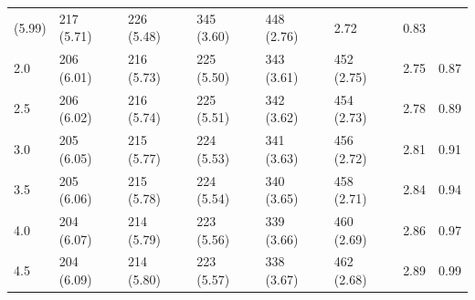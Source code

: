 \begin{table}[h]
{\begin{tabular}{@{}llllllll@{}}
            (5.99)                             &
            217 (5.71) & 226
            (5.48)                             &
            345 (3.60) & 448
            (2.76)                             &
            2.72          &
            0.83
            \\
            2.0                                   & 206 (6.01)
                                                  & 216
            (5.73)                             & 225 (5.50)
                                                  & 343
            (3.61)                             & 452 (2.75)
                                                  &
            2.75                                  & 0.87
            \\
            2.5                                   & 206
            (6.02)                             &
            216 (5.74) & 225
            (5.51)                             &
            342 (3.62) & 454
            (2.73)                             &
            2.78          &
            0.89
            \\
            3.0                                   & 205 (6.05)
                                                  & 215
            (5.77)                             & 224 (5.53)
                                                  & 341
            (3.63)                             & 456 (2.72)
                                                  &
            2.81                                  & 0.91
            \\
            3.5                                   & 205
            (6.06)                             &
            215 (5.78) & 224
            (5.54)                             &
            340 (3.65) & 458
            (2.71)                             &
            2.84          &
            0.94
            \\
            4.0                                   & 204 (6.07)
                                                  & 214
            (5.79)                             & 223 (5.56)
                                                  & 339
            (3.66)                             & 460 (2.69)
                                                  &
            2.86                                  & 0.97
            \\
            4.5                                   & 204
            (6.09)                             &
            214 (5.80) & 223
            (5.57)                             &
            338 (3.67) & 462
            (2.68)                             &
            2.89          &
            0.99
            \\ \bottomrule
        \end{tabular}%
    }
\end{table}

